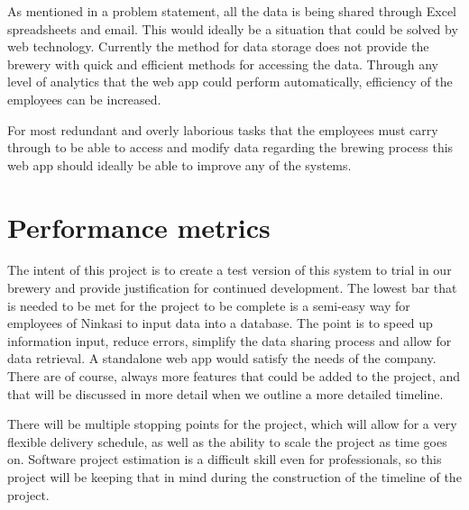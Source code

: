 \documentclass[draftclsnofoot,onecolumn,letterpaper,10pt]{IEEEtran}
\begin{document}
As mentioned in a problem statement, all the data is being shared through Excel spreadsheets and email. This would ideally be a situation that could be solved by web technology. Currently the method for data storage does not provide the brewery with quick and efficient methods for accessing the data. Through any level of analytics that the web app could perform automatically, efficiency of the employees can be increased.

For most redundant and overly laborious tasks that the employees must carry through to be able to access and modify data regarding the brewing process this web app should ideally be able to improve any of the systems.




\section{Performance metrics}

The intent of this project is to create a test version of this system to trial in our brewery and provide justification for continued development. The lowest bar that is needed to be met for the project to be complete is a semi-easy way for employees of Ninkasi to input data into a database. The point is to speed up information input, reduce errors, simplify the data sharing process and allow for data retrieval. A standalone web app would satisfy the needs of the company. There are of course, always more features that could be added to the project, and that will be discussed in more detail when we outline a more detailed timeline.

There will be multiple stopping points for the project, which will allow for a very flexible delivery schedule, as well as the ability to scale the project as time goes on. Software project estimation is a difficult skill even for professionals, so this project will be keeping that in mind during the construction of the timeline of the project.




\nocite{*}
\end{document}
